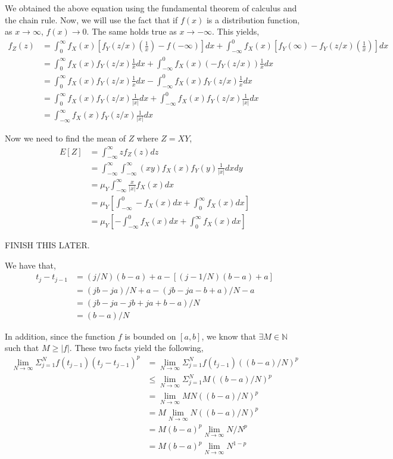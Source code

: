 \documentclass[12pt]{article}
\newenvironment{problem}[2][Problem]{\begin{trivlist}
\item[\hskip \labelsep {\bfseries #1}\hskip \labelsep {\bfseries #2.}]}{\end{trivlist}}
\begin{document}
We obtained the above equation using the fundamental theorem of calculus and the chain rule. Now, we will use the fact that if $f(x)$ is a distribution function, as $x \to \infty$, $f(x) \to 0$. The same holds true as $x \to -\infty$. This yields,
\begin{align*}
f_Z(z) &= \int_{0}^{\infty} f_X(x) \left[f_Y(z/x)\left(\frac{1}{x}\right) - f(-\infty)\right] dx + \int_{-\infty}^{0} f_X(x) \left[f_Y(\infty) - f_Y(z/x)\left(\frac{1}{x}\right)\right] dx\\
&= \int_{0}^{\infty} f_X(x)f_Y(z/x)\frac{1}{x} dx + \int_{-\infty}^{0} f_X(x)(-f_Y(z/x))\frac{1}{x} dx\\
&= \int_{0}^{\infty} f_X(x)f_Y(z/x)\frac{1}{x} dx - \int_{-\infty}^{0} f_X(x)f_Y(z/x)\frac{1}{x} dx\\
&= \int_{0}^{\infty} f_X(x)f_Y(z/x)\frac{1}{|x|} dx + \int_{-\infty}^{0} f_X(x)f_Y(z/x)\frac{1}{|x|} dx\\
&= \int_{-\infty}^{\infty} f_X(x)f_Y(z/x)\frac{1}{|x|} dx
\end{align*}

Now we need to find the mean of $Z$ where $Z = XY$,
\begin{align*}
E[Z] &= \int_{-\infty}^{\infty} zf_Z(z)dz\\
&= \int_{-\infty}^{\infty} \int_{-\infty}^{\infty} (xy)f_X(x)f_Y(y)\frac{1}{|x|} dxdy\\
&= \mu_Y \int_{-\infty}^{\infty} \frac{x}{|x|}f_X(x)dx\\
&= \mu_Y \left[\int_{-\infty}^0 - f_X(x) dx + \int_{0}^{\infty} f_X(x) dx\right]\\
&= \mu_Y \left[-\int_{-\infty}^0 f_X(x) dx + \int_{0}^{\infty} f_X(x) dx\right]
\end{align*}

FINISH THIS LATER.

\begin{problem}{9}
\end{problem}

We have that,
\begin{align*}
t_j - t_{j-1} &= (j/N)(b-a) + a - [(j-1/N)(b-a) + a]\\
&= (jb - ja)/N + a - (jb - ja - b + a)/N - a\\
&= (jb - ja - jb + ja + b - a)/N\\
&= (b - a)/N
\end{align*}

In addition, since the function $f$ is bounded on $[a,b]$, we know that $\exists M \in \mathbb{N}$ such that $M \geq |f|$. These two facts yield the following,
\begin{align*}
\lim_{N \to \infty} \Sigma^N_{j=1} f(t_{j-1})(t_j - t_{j-1})^p &= \lim_{N \to \infty} \Sigma^N_{j=1} f(t_{j-1})((b - a)/N)^p\\
&\leq \lim_{N \to \infty} \Sigma^N_{j=1} M((b - a)/N)^p\\
&= \lim_{N \to \infty} MN((b - a)/N)^p\\
&= M \lim_{N \to \infty} N((b - a)/N)^p\\
&= M(b-a)^p \lim_{N \to \infty} N/N^p\\
&= M(b-a)^p \lim_{N \to \infty} N^{1-p}
\end{align*}
\end{document}
